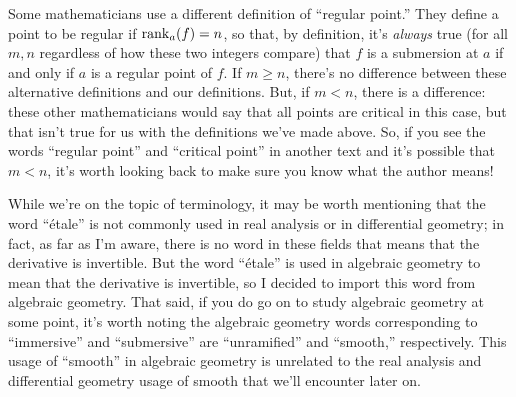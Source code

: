 \begin{caution}
	Some mathematicians use a different definition of ``regular point.'' They define a point to be regular if $\operatorname{rank}_a(f) = n$, so that, by definition, it's \emph{always} true (for all $m, n$ regardless of how these two integers compare) that $f$ is a submersion at $a$ if and only if $a$ is a regular point of $f$. If $m \geq n$, there's no difference between these alternative definitions and our definitions. But, if $m < n$, there is a difference: these other mathematicians would say that all points are critical in this case, but that isn't true for us with the definitions we've made above. So, if you see the words ``regular point'' and ``critical point'' in another text and it's possible that $m < n$, it's worth looking back to make sure you know what the author means!
\end{caution}

\begin{unimportantremark}
	While we're on the topic of terminology, it may be worth mentioning that the word ``\'etale'' is not commonly used in real analysis or in differential geometry; in fact, as far as I'm aware, there is no word in these fields that means that the derivative is invertible. But the word ``\'etale'' is used in algebraic geometry to mean that the derivative is invertible, so I decided to import this word from algebraic geometry. That said, if you do go on to study algebraic geometry at some point, it's worth noting the algebraic geometry words corresponding to ``immersive'' and ``submersive'' are ``unramified'' and ``smooth,'' respectively. This usage of ``smooth'' in algebraic geometry is unrelated to the real analysis and differential geometry usage of smooth that we'll encounter later on. 
\end{unimportantremark}


